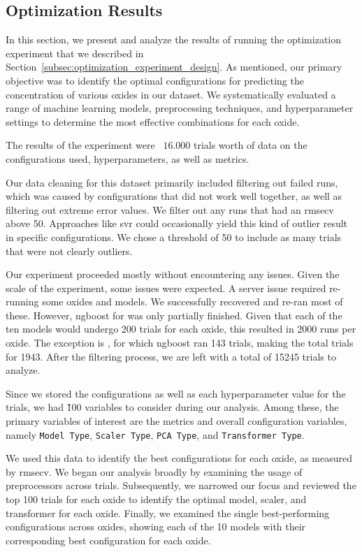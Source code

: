 \subsection{Optimization Results}\label{sec:optimization_results}
In this section, we present and analyze the results of running the optimization experiment that we described in Section~\ref{subsec:optimization_experiment_design}.
As mentioned, our primary objective was to identify the optimal configurations for predicting the concentration of various oxides in our dataset.
We systematically evaluated a range of machine learning models, preprocessing techniques, and hyperparameter settings to determine the most effective combinations for each oxide.

The results of the experiment were ~$16.000$ trials worth of data on the configurations used, hyperparameters, as well as metrics.

Our data cleaning for this dataset primarily included filtering out failed runs, which was caused by configurations that did not work well together, as well as filtering out extreme error values.
We filter out any runs that had an \gls{rmsecv} above 50.
Approaches like \gls{svr} could occasionally yield this kind of outlier result in specific configurations.
We chose a threshold of 50 to include as many trials that were not clearly outliers.

Our experiment proceeded mostly without encountering any issues.
Given the scale of the experiment, some issues were expected.
A server issue required re-running some oxides and models. We successfully recovered and re-ran most of these.
However, \gls{ngboost} for  was only partially finished.
Given that each of the ten models would undergo 200 trials for each oxide, this resulted in 2000 runs per oxide.
The exception is , for which \gls{ngboost} ran 143 trials, making the total trials for  1943.
After the filtering process, we are left with a total of 15245 trials to analyze.

Since we stored the configurations as well as each hyperparameter value for the trials, we had \~100 variables to consider during our analysis.
Among these, the primary variables of interest are the metrics and overall configuration variables, namely \texttt{Model Type}, \texttt{Scaler Type}, \texttt{PCA Type}, and \texttt{Transformer Type}.

We used this data to identify the best configurations for each oxide, as measured by \gls{rmsecv}.
We began our analysis broadly by examining the usage of preprocessors across trials. Subsequently, we narrowed our focus and reviewed the top 100 trials for each oxide to identify the optimal model, scaler, and transformer for each oxide.
Finally, we examined the single best-performing configurations across oxides, showing each of the 10 models with their corresponding best configuration for each oxide.

